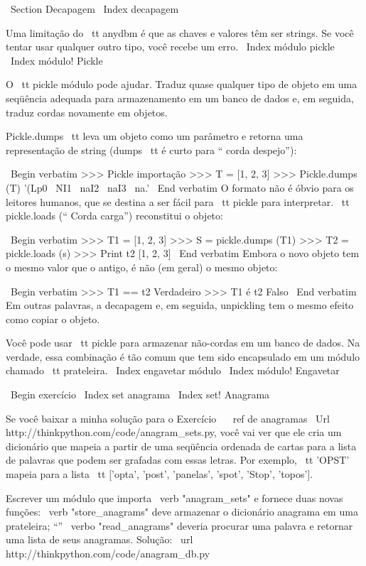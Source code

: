 \documentclass[10pt]{book}
\begin{document}
\begin {itemize}
{{{{{{{{{{\ Section {} Decapagem
\ Index {} decapagem

Uma limitação do {\ tt anydbm} é que as chaves e valores têm
ser strings. Se você tentar usar qualquer outro tipo, você recebe um
erro.
\ Index {módulo pickle}
\ Index {módulo! Pickle}

O {\ tt pickle} módulo pode ajudar. Traduz
quase qualquer tipo de objeto em uma seqüência adequada para armazenamento em um
banco de dados e, em seguida, traduz cordas novamente em objetos.

{Pickle.dumps \ tt} leva um objeto como um parâmetro e retorna
uma representação de string ({dumps \ tt} é curto para `` corda despejo''):

\ Begin {verbatim}
>>> Pickle importação
>>> T = [1, 2, 3]
>>> Pickle.dumps (T)
'(Lp0 \ NI1 \ naI2 \ naI3 \ na.'
\ End {verbatim}
%
O formato não é óbvio para os leitores humanos, que se destina a ser
fácil para {\ tt pickle} para interpretar. {\ tt pickle.loads}
(`` Corda carga'') reconstitui o objeto:

\ Begin {verbatim}
>>> T1 = [1, 2, 3]
>>> S = pickle.dumps (T1)
>>> T2 = pickle.loads (s)
>>> Print t2
[1, 2, 3]
\ End {verbatim}
%
Embora o novo objeto tem o mesmo valor que o antigo, é
não (em geral) o mesmo objeto:

\ Begin {verbatim}
>>> T1 == t2
Verdadeiro
>>> T1 é t2
Falso
\ End {verbatim}
%
Em outras palavras, a decapagem e, em seguida, unpickling tem o mesmo efeito
como copiar o objeto.

Você pode usar {\ tt pickle} para armazenar não-cordas em um banco de dados.
Na verdade, essa combinação é tão comum que tem sido
encapsulado em um módulo chamado {\ tt prateleira}.  
\ Index {engavetar módulo}
\ Index {módulo! Engavetar}


\ Begin {} exercício
\ Index {set anagrama}
\ Index {set! Anagrama}

Se você baixar a minha solução para o Exercício ~ \ ref {} de anagramas
\ Url {http://thinkpython.com/code/anagram_sets.py}, você vai ver que ele cria
um dicionário que mapeia a partir de uma seqüência ordenada de cartas para a lista de
palavras que podem ser grafadas com essas letras. Por exemplo, {\ tt
  'OPST'} mapeia para a lista {\ tt ['opta', 'post', 'panelas', 'spot',
    'Stop', 'topos']}.

Escrever um módulo que importa \ verb "anagram_sets" e fornece
duas novas funções: \ verb "store_anagrams" deve armazenar o
dicionário anagrama em uma prateleira; ``'' \ verbo "read_anagrams" deveria
procurar uma palavra e retornar uma lista de seus anagramas.
Solução: \ url {http://thinkpython.com/code/anagram_db.py}

}}}}}}}}}}
\end{itemize}
\end{document}
